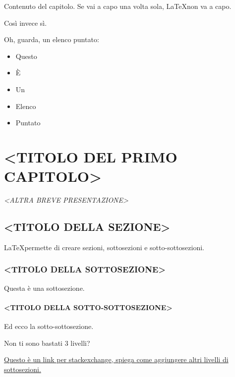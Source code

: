 \documentclass[envcountsame,envcountchap]{svmono}
\begin{document}
Contenuto del capitolo.
Se vai a capo una volta sola, \LaTeX non va a capo.

Così invece sì.

Oh, guarda, un elenco puntato:
\begin{itemize}
    \item Questo
    \item È
    \item Un
    \item Elenco
    \item Puntato
\end{itemize}




\mainmatter%


\chapter{<TITOLO DEL PRIMO CAPITOLO>} \label{Cap.1}

\vspace{2cm}

\begin{flushright}
\textit{<ALTRA BREVE PRESENTAZIONE>}
\end{flushright}

\vspace{0.5cm}

\section{<TITOLO DELLA SEZIONE>}
\LaTeX permette di creare sezioni, sottosezioni e sotto-sottosezioni.

\subsection{<TITOLO DELLA SOTTOSEZIONE>}
Questa è una sottosezione.

\subsubsection{<TITOLO DELLA SOTTO-SOTTOSEZIONE>}
Ed ecco la sotto-sottosezione.

Non ti sono bastati 3 livelli?

\href{https://tex.stackexchange.com/questions/60209/how-to-add-an-extra-level-of-sections-with-headings-below-subsubsection}{Questo è un link per stackexchange, spiega come aggiungere altri livelli di sottosezioni.}
\end{document}
